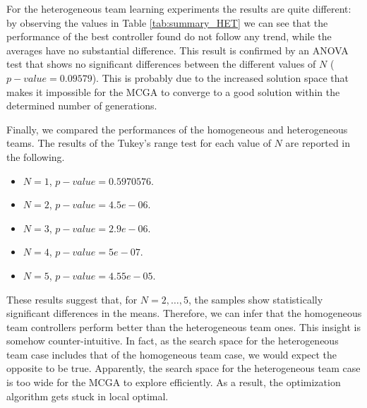 \documentclass[journal]{IEEEtran}
\begin{document}
For the heterogeneous team learning experiments
the results are quite different: by observing the values in Table \ref{tab:summary_HET} we can see that the performance of the best controller found do not follow any trend,
while the averages have no substantial difference. This result is confirmed by an ANOVA test that shows no significant differences between the different values of $N$ ($p-value=0.09579$). This is probably due to the increased solution space that makes it impossible for the MCGA to converge to a good solution within the determined number of generations.

Finally, we compared the performances of the homogeneous and heterogeneous teams. The results of the Tukey's range test for each value of $N$ are reported in the following.

\begin{itemize}
\item $N=1$, $p-value = 0.5970576$.
\item $N=2$, $p-value = 4.5e-06$.
\item $N=3$, $p-value = 2.9e-06$.
\item $N=4$, $p-value = 5e-07$.
\item $N=5$, $p-value = 4.55e-05$.
\end{itemize}

These results suggest that, for $N=2,\ldots,5$, the samples show statistically significant differences in the means. Therefore, we can infer that the homogeneous team controllers perform better than the heterogeneous team ones. This insight is somehow counter-intuitive. In fact, as the search space for the heterogeneous team case includes that of the homogeneous team case, we would expect the opposite to be true. Apparently, the search space for the heterogeneous team case is too wide for the MCGA to explore efficiently. As a result, the optimization algorithm gets stuck in local optimal.
\end{document}
